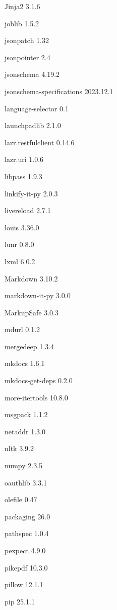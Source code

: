 \documentclass[11pt,a4paper]{article}
\begin{document}
Jinja2                    3.1.6

joblib                    1.5.2

jsonpatch                 1.32

jsonpointer               2.4

jsonschema                4.19.2

jsonschema-specifications 2023.12.1

language-selector         0.1

launchpadlib              2.1.0

lazr.restfulclient        0.14.6

lazr.uri                  1.0.6

libpass                   1.9.3

linkify-it-py             2.0.3

livereload                2.7.1

louis                     3.36.0

lunr                      0.8.0

lxml                      6.0.2

Markdown                  3.10.2

markdown-it-py            3.0.0

MarkupSafe                3.0.3

mdurl                     0.1.2

mergedeep                 1.3.4

mkdocs                    1.6.1

mkdocs-get-deps           0.2.0

more-itertools            10.8.0

msgpack                   1.1.2

netaddr                   1.3.0

nltk                      3.9.2

numpy                     2.3.5

oauthlib                  3.3.1

olefile                   0.47

packaging                 26.0

pathspec                  1.0.4

pexpect                   4.9.0

pikepdf                   10.3.0

pillow                    12.1.1

pip                       25.1.1
\end{document}
